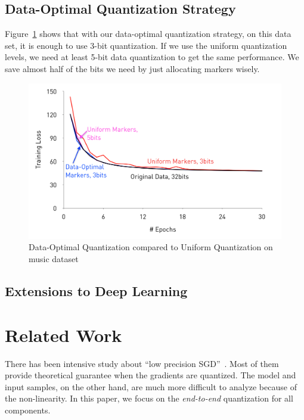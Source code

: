 \documentclass{article}
\begin{document}
\subsection{Data-Optimal Quantization Strategy}

Figure~\ref{fig:optimal} shows that with our data-optimal quantization strategy, on this data set, it is enough to use 3-bit quantization. If we use the uniform quantization levels, we need at least 5-bit data quantization to get the same performance. We save almost half of the bits we need by just allocating markers wisely.

\begin{figure}[h]
\centering
\includegraphics[width=\columnwidth]{final-experiments/OptimalQuantization} 
\caption{Data-Optimal Quantization compared to Uniform Quantization on music dataset}
\label{fig:optimal}
\end{figure}
\subsection{Extensions to Deep Learning}

\section{Related Work} 

There has been intensive study about ``low precision SGD''~\cite{DeSa:NIPS:2015,Alistarh:2016:ArXiv}. 
Most of them provide
theoretical guarantee when the gradients are quantized.
The model and input samples, on the other hand, are much more difficult
to analyze because of the non-linearity. In this paper, 
we
focus on the {\em end-to-end}
quantization for all components.

\vspace{-1em}
\end{document}
